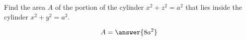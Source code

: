 \documentclass{ximera}
\author{David Guichard \and Neal Koblitz \and H. Jerome Keisler \and Albert Scheller \and Barry Balof \and Mike Wills \and Matthew Carr}
\begin{document}
\begin{exercise}




Find the area $A$ of the portion of the cylinder $x^2+z^2=a^2$ that
lies inside the cylinder $x^2+y^2=a^2$.

\begin{prompt}
\[
A=\answer{8a^2}
\]
\end{prompt}


\end{exercise}
\end{document}
